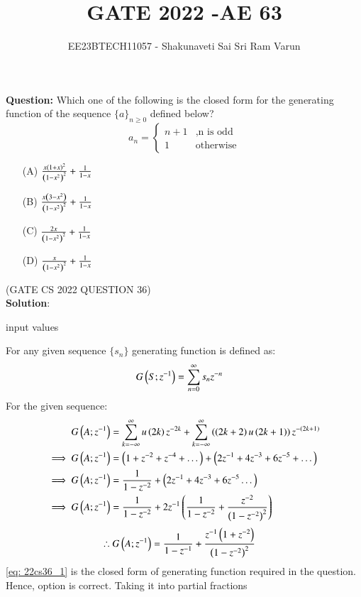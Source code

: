 \documentclass[journal,12pt,twocolumn]{IEEEtran}
\theoremstyle{remark}
\begin{document}

\vspace{3cm}

\title{GATE 2022  -AE 63}
\author{EE23BTECH11057 - Shakunaveti Sai Sri Ram Varun$^{}$%
}
\maketitle
\newpage
\bigskip
\vspace{2cm}
\textbf{Question: }
Which one of the following is the closed form for the generating function of the sequence $ \bigl\{ a \bigl\}_{n \geq0}$ defined below?
\begin{equation}
a_n=
    \begin{cases}
        n+1 & , \text{n is odd}\\
        1 & \text{otherwise}
    \end{cases}
\end{equation}\label{eq: 22cs361}


\begin{enumerate}
    \item[(A)] $ \frac{x\left(1+x\right)^2}{\left(1-x^2\right)^2} + \frac{1}{1-x}$
    \item[(B)]$ \frac{x\left(3-x^2\right)}{\left(1-x^2\right)^2} + \frac{1}{1-x}$
    \item[(C)] $ \frac{2x}{\left(1-x^2\right)^2} + \frac{1}{1-x}$
    \item[(D)] $ \frac{x}{\left(1-x^2\right)^2} + \frac{1}{1-x}$  
\end{enumerate}
\hfill(GATE CS 2022 QUESTION 36)\\
\textbf{Solution}:\\
\begin{table}[h!] 
\centering

\caption{input values}
\label{tab: Table2022cs36}
\end{table}
For any given sequence $ \bigl\{ s_n \bigl\}$ generating function is defined as:
\begin{align}
G\left(S;z^{-1}\right) &= \sum_{n=0}^{\infty}s_n z^{-n}
\end{align}
For the given sequence:
\begin{align}
G\left(A;z^{-1}\right) &= \sum_{k=-\infty}^{\infty} u\left(2k\right) z^{-2k}+ \sum_{k=-\infty}^{\infty} \left(\left(2k+2\right)u\left(2k+1\right)\right) z^{-\left(2k+1\right)}\\
\implies G\left(A;z^{-1}\right) &= \left(1+z^{-2}+z^{-4} + \dots\right) + \left(2z^{-1}+4z^{-3} + 6z^{-5} + \dots\right)\\
\implies G\left(A;z^{-1}\right) &= \frac{1}{1-z^{-2}} + \left(2z^{-1}+4z^{-3}+6z^{-5} \dots\right)\\
\implies G\left(A;z^{-1}\right) &= \frac{1}{1-z^{-2}} +2z^{-1}\left(\frac{1}{1-z^{-2}}+\frac{z^{-2}}{\left(1-z^{-2}\right)^2}\right)
\end{align}
\begin{align}
\therefore G\left(A;z^{-1}\right) &= \frac{1}{1-z^{-1}} + \frac{z^{-1}\left(1+z^{-2}\right)}{\left(1-z^{-2}\right)^2}\label{eq: 22cs36_1}
\end{align}
\eqref{eq: 22cs36_1} is the closed form of generating function required in the question.\\
Hence, option  is correct.
Taking it into partial fractions
\end{document}
